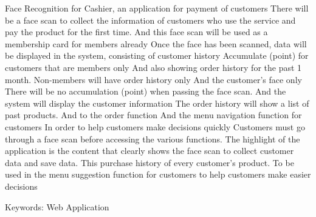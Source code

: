 \begin{englishabstract}
Face Recognition for Cashier, an application for payment of customers There will be a face scan to collect the information of customers who use the service and pay the product for the first time. And this face scan will be used as a membership card for members already Once the face has been scanned, data will be displayed in the system, consisting of customer history Accumulate (point) for customers that are members only And also showing order history for the past 1 month. Non-members will have order history only And the customer's face only There will be no accumulation (point) when passing the face scan. And the system will display the customer information The order history will show a list of past products. And to the order function And the menu navigation function for customers In order to help customers make decisions quickly Customers must go through a face scan before accessing the various functions. The highlight of the application is the content that clearly shows the face scan to collect customer data and save data. This purchase history of every customer's product. To be used in the menu suggestion function for customers to help customers make easier decisions


\noindent
Keywords: Web Application
\end{englishabstract}

